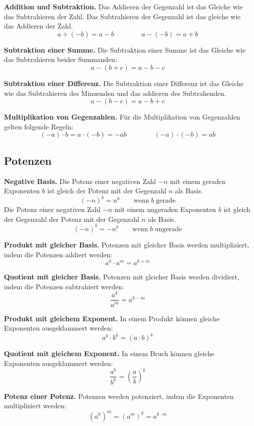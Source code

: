 \textbf{Addition und Subtraktion.} Das Addieren der Gegenzahl ist das Gleiche wie das Subtrahieren der Zahl. Das Subtrahieren der Gegenzahl ist das gleiche wie das Addieren der Zahl.
\[
  a+(-b) = a-b \qquad\qquad a-(-b) = a+b
\]

\textbf{Subtraktion einer Summe.} Die Subtraktion einer Summe ist das Gleiche wie das Subtrahieren beider Summanden:
\[
  a-(b+c) = a-b-c
\]

\textbf{Subtraktion einer Differenz.} Die Subtraktion einer Differenz ist das Gleiche wie das Subtrahieren des Minuenden und das addieren des Subtrahenden.
\[
  a-(b-c) = a-b+c
\]

\textbf{Multiplikation von Gegenzahlen.} Für die Multiplikation von Gegenzahlen gelten folgende Regeln:
\[
  (-a)\cdot b = a\cdot(-b) = -ab \qquad\qquad  (-a)\cdot(-b) = ab
\]

\subsection{Potenzen}

\textbf{Negative Basis.} Die Potenz einer negativen Zahl $-n$ mit einem geraden Exponenten $b$ ist gleich der Potenz mit der Gegenzahl $n$ als Basis.
  \[
    (-n)^{b} = n^{b} \qquad \text{wenn}\;b\;\text{gerade}
  \]
  Die Potenz einer negativen Zahl $-n$ mit einem ungeraden Exponenten $b$ ist gleich der Gegenzahl der Potenz mit der Gegenzahl $n$ als Basis.
  \[
    (-n)^{b} = -n^{b} \qquad \text{wenn}\;b\;\text{ungerade}
  \]

\textbf{Produkt mit gleicher Basis.} Potenzen mit gleicher Basis werden multipliziert, indem die Potenzen addiert werden:
\[
  a^{k} \cdot a^{m} = a^{k+m}
\]

\textbf{Quotient mit gleicher Basis.} Potenzen mit gleicher Basis werden dividiert, indem die Potenzen subtrahiert werden:
\[
  \frac{a^{k}}{a^{m}} = a^{k-m}
\]

\textbf{Produkt mit gleichem Exponent.} In einem Produkt können gleiche Exponenten ausgeklammert werden:
\[
  a^{k}\cdot b^{k} = (a\cdot b)^{k}
\]

\textbf{Quotient mit gleichem Exponent.} In einem Bruch können gleiche Exponenten ausgeklammert werden:
\[
  \frac{a^{k}}{b^{k}} = \left(\frac{a}{b}\right)^{k}
\]

\textbf{Potenz einer Potenz.} Potenzen werden potenziert, indem die Exponenten multipliziert werden:
\[
  \left(a^{k}\right)^{m} = \left(a^{m}\right)^{k}= a^{k\cdot m}
\]


